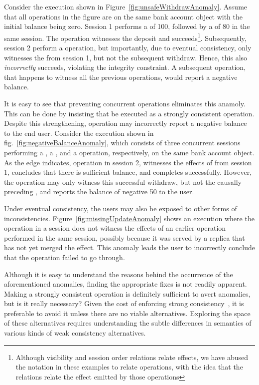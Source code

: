 Consider the execution shown in Figure~\ref{fig:unsafeWithdrawAnomaly}. Assume
that all operations in the figure are on the same bank account object with the
initial balance being zero. Session 1 performs a  of 100, followed
by a  of 80 in the same session. The  operation
witnesses the deposit and succeeds\footnote{Although visibility and session
order relations relate effects, we have abused the notation in these examples
to relate operations, with the idea that the relations relate the effect
emitted by those operations}. Subsequently, session 2 perform a 
operation, but importantly, due to eventual consistency, only witnesses the
 from session 1, but not the subsequent withdraw. Hence, this
 also \emph{incorrectly} succeeds, violating the integrity
constraint. A subsequent  operation, that happens to witness all
the previous operations, would report a negative balance.

It is easy to see that preventing concurrent  operations
eliminates this anamoly. This can be done by insisting that  be
executed as a strongly consistent operation. Despite this strengthening,
 operation may incorrectly report a negative balance to the end
user. Consider the execution shown in fig.~\ref{fig:negativeBalanceAnomaly},
which consists of three concurrent sessions performing a , a
, and a  operation, respectively, on the same bank
account object. As the  edge indicates, operation  in
session 2, witnesses the effects of  from session 1, concludes
that there is sufficient balance, and completes successfully. However, the
 operation may only witness this successful withdraw, but not
the causally preceding , and reports the balance of negative 50 to
the user.

Under eventual consistency, the users may also be exposed to other forms of
inconsistencies. Figure~\ref{fig:missingUpdateAnomaly} shows an execution where
the  operation in a session does not witness the effects of an
earlier  operation performed in the same session, possibly because
it was served by a replica that has not yet merged the  effect.
This anomaly leads the user to incorrectly conclude that the 
operation failed to go through.

Although it is easy to understand the reasons behind the occurrence of the
aforementioned anomalies, finding the appropriate fixes is not readily
apparent. Making  a strongly consistent operation is definitely
sufficient to avert anomalies, but is it really necessary? Given the cost of
enforcing strong consistency~\cite{DynamoDB, Pileus}, it is preferable to avoid
it unless there are no viable alternatives. Exploring the space of these
alternatives requires understanding the subtle differences in semantics of
various kinds of weak consistency alternatives.

